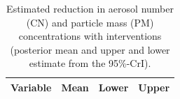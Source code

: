 \documentclass[fleqn,11pt]{wlscirep_supp}
\begin{document}
\begin{table}[!htpb]
    \caption[Estimated reduction in aerosol and particle concentrations with interventions]{Estimated reduction in aerosol number (CN) and particle mass (PM) concentrations with interventions (posterior mean and upper and lower estimate from the 95\%-CrI).}
    \label{tab:palas-est-results}
    \centering
    \footnotesize
    \begin{tabular}{l r r r}
    \toprule
    Variable & Mean & Lower & Upper \\
    \midrule
    
    \bottomrule
    \end{tabular}
    
\end{table}

\clearpage


\end{document}
